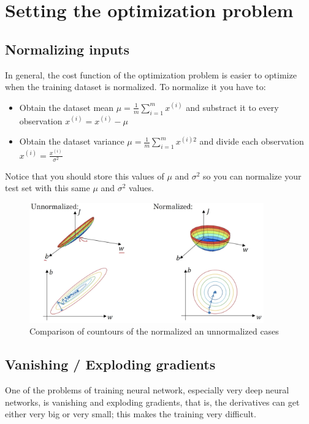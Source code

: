 \section*{Setting the optimization problem}
\subsection*{Normalizing inputs}

In general, the cost function of the optimization problem is easier to optimize when 
the training dataset is normalized. To normalize it you have to:
\begin{itemize}
    \item Obtain the dataset mean $\mu = \frac{1}{m}\sum_{i=1}^m x^{(i)}$ and substract 
    it to every observation $x^{(i)} = x^{(i)} - \mu$
    \item Obtain the dataset variance $\mu = \frac{1}{m}\sum_{i=1}^m x^{(i)2}$ and divide
    each observation $x^{(i)} = \frac{x^{(i)}}{\sigma^2}$
\end{itemize}
Notice that you should store this values of $\mu$ and $\sigma^2$ so you can normalize
your test set with this same $\mu$ and $\sigma^2$ values.
\begin{figure}[H]
    \begin{center}
            \includegraphics[width=0.9\textwidth]{img/normalized.png}
            \caption{Comparison of countours of the normalized an unnormalized cases}
        \end{center}
\end{figure}

\subsection*{Vanishing / Exploding gradients}
One of the problems of training neural network, especially very deep neural networks, 
is vanishing and exploding gradients, that is, the derivatives can get either 
very big or very small; this makes the training very difficult.

